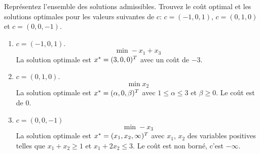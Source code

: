 \begin{enumerate}
    Représentez l'ensemble des solutions admissibles. Trouvez le coût optimal et les solutions  optimales pour les
    valeurs suivantes de $c$: $c=(-1, 0, 1)$,
    $c=(0, 1, 0)$ et
    $c=(0, 0, -1)$.

    \begin{solution}
      \begin{enumerate}
        \item $c = (-1,0,1)$.
          $$ \min -x_{1} + x_{3} $$
          La solution optimale est $x^* = (3,0,0)^{T}$
          avec un coût de $-3$.
        \item $c = (0,1,0)$.
          $$ \min x_{2} $$
          La solution optimale est  $x^* = (\alpha,0,\beta)^{T}$
          avec $1\le \alpha \le 3$ et $\beta \geq 0$.
          Le coût est de 0.
        \item $c = (0,0,-1)$
          $$ \min -x_{3} $$
          La solution optimale est $x^* = (x_{1},x_{2},\infty)^{T}$
          avec $x_{1}$, $x_{2}$ des variables positives telles que
          $x_{1} + x_{2} \geq 1$ et $x_{1} + 2x_{2} \le 3$.
          Le coût est non borné, c'est $-\infty$.
      \end{enumerate}
      \begin{center}
      \end{center}
    \end{solution}



\end{enumerate}
